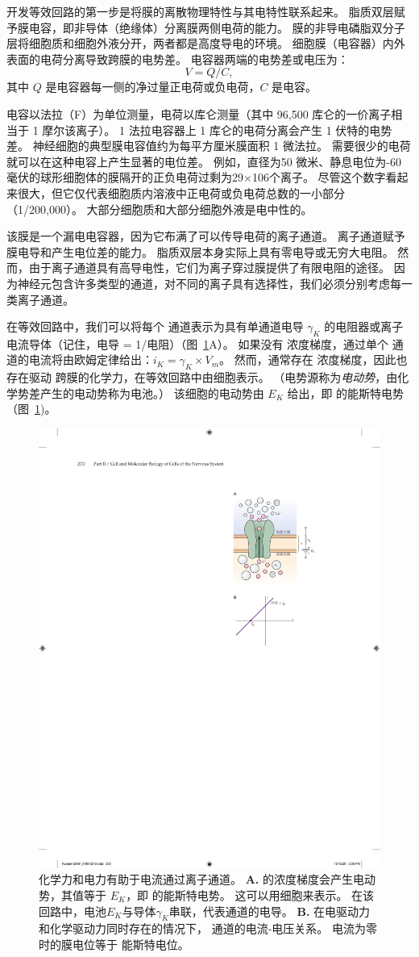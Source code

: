 开发等效回路的第一步是将膜的离散物理特性与其电特性联系起来。
脂质双层赋予膜电容，即非导体（绝缘体）分离膜两侧电荷的能力。
膜的非导电磷脂双分子层将细胞质和细胞外液分开，两者都是高度导电的环境。
细胞膜（电容器）内外表面的电荷分离导致跨膜的电势差。
电容器两端的电势差或电压为：
\begin{equation}
	V = Q/C,
\end{equation}
其中 $Q$ 是电容器每一侧的净过量正电荷或负电荷，$C$ 是电容。


电容以法拉（F）为单位测量，电荷以库仑测量（其中 96,500 库仑的一价离子相当于 1 摩尔该离子）。
1 法拉电容器上 1 库仑的电荷分离会产生 1 伏特的电势差。
神经细胞的典型膜电容值约为每平方厘米膜面积 1 微法拉。 
需要很少的电荷就可以在这种电容上产生显著的电位差。 
例如，直径为50 微米、静息电位为-60 毫伏的球形细胞体的膜隔开的正负电荷过剩为29×106个离子。
尽管这个数字看起来很大，但它仅代表细胞质内溶液中正电荷或负电荷总数的一小部分（1/200,000）。
大部分细胞质和大部分细胞外液是电中性的。


该膜是一个漏电电容器，因为它布满了可以传导电荷的离子通道。
离子通道赋予膜电导和产生电位差的能力。
脂质双层本身实际上具有零电导或无穷大电阻。
然而，由于离子通道具有高导电性，它们为离子穿过膜提供了有限电阻的途径。
因为神经元包含许多类型的通道，对不同的离子具有选择性，我们必须分别考虑每一类离子通道。


在等效回路中，我们可以将每个  通道表示为具有单通道电导 $\gamma_K$ 的电阻器或离子电流导体（记住，电导 = 1/电阻）（图~\ref{fig:9_6}A）。 
如果没有  浓度梯度，通过单个  通道的电流将由欧姆定律给出：$i_K = \gamma_K \times V_m$。
然而，通常存在  浓度梯度，因此也存在驱动  跨膜的化学力，在等效回路中由细胞表示。
（电势源称为\textit{电动势}，由化学势差产生的电动势称为电池。）
该细胞的电动势由 $E_K$ 给出，即  的能斯特电势（图~\ref{fig:9_6})。


\begin{figure}[htbp]
	\centering
	\includegraphics[width=0.5\linewidth]{chap09/fig_9_6}
	\caption{化学力和电力有助于电流通过离子通道。
		\textbf{A.}  的浓度梯度会产生电动势，其值等于 $E_K$，即  的能斯特电势。
		这可以用细胞来表示。 在该回路中，电池$E_K$与导体$\gamma_K$串联，代表通道的电导。
		\textbf{B.} 在电驱动力和化学驱动力同时存在的情况下， 通道的电流-电压关系。
		电流为零时的膜电位等于  能斯特电位。}
	\label{fig:9_6}
\end{figure}


